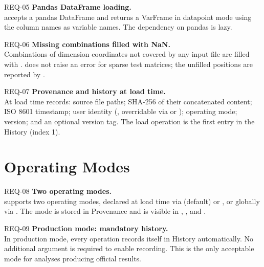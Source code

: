 \begin{reqbox}{REQ-05}{\stable}
\textbf{Pandas DataFrame loading.}\\
 accepts a pandas DataFrame and returns a VarFrame in
datapoint mode using the column names as variable names. The dependency
on pandas is lazy.
\end{reqbox}

\begin{reqbox}{REQ-06}{\stable}
\textbf{Missing combinations filled with NaN.}\\
Combinations of dimension coordinates not covered by any input file are
filled with . \itc{} does not raise an error for sparse test
matrices; the unfilled positions are reported by .
\end{reqbox}

\begin{reqbox}{REQ-07}{\stable}
\textbf{Provenance and history at load time.}\\
At load time \itc{} records: source file paths; SHA-256 of their
concatenated content; ISO 8601 timestamp; user identity
(, overridable via
 or ); operating mode; \itc{}
version; and an optional version tag. The load operation is the first
entry in the History (index 1).
\end{reqbox}

\section{Operating Modes}

\begin{reqbox}{REQ-08}{\stable}
\textbf{Two operating modes.}\\
\itc{} supports two operating modes, declared at load time via
 (default) or , or globally via
. The mode is stored in Provenance and is
visible in , , and .
\end{reqbox}

\begin{reqbox}{REQ-09}{\stable}
\textbf{Production mode: mandatory history.}\\
In production mode, every operation records itself in History
automatically. No additional argument is required to enable recording.
This is the only acceptable mode for analyses producing official results.
\end{reqbox}

